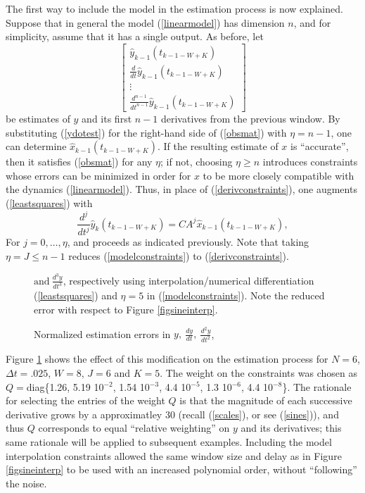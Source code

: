 The first way to include the model in the estimation process is now
explained.  Suppose that in general the model (\ref{linearmodel}) has dimension
$n$, and for simplicity, assume that it has a single output.
As before, let
\begin{equation}
\left[ \begin{array}{c} 
\hat{y}_{k-1}(t_{k-1-W+K}) \\
\frac{d}{dt} \hat{y}_{k-1}(t_{k-1-W+K}) \\ 
\vdots \\ 
\frac{d^{n-1}}{dt^{n-1}} \hat{y}_{k-1}(t_{k-1-W+K})
\end{array} \right]
\label{ydotest}
\end{equation}
be estimates of $y$ and its first $n-1$ derivatives from the previous window.
By substituting (\ref{ydotest}) for the right-hand side of (\ref{obsmat}) with
$\eta = n-1$, one can
determine $\hat{x}_{k-1}(t_{k-1-W+K})$. 
If the resulting estimate of $x$ is ``accurate'', then it satisfies (\ref{obsmat}) for
any $\eta$; if not, choosing $\eta \ge n$ introduces constraints whose
errors can be minimized in order for $x$ to be more closely compatible
with the dynamics (\ref{linearmodel}).  Thus, in place of
(\ref{derivconstraints}),
one augments (\ref{leastsquares}) with
\begin{equation}
\frac{d^j}{dt^j} \hat{y}_k(t_{k-1-W+K}) = CA^j  \hat{x}_{k-1}(t_{k-1-W+K}),
\label{modelconstraints}
\end{equation}
For $j=0, \ldots, \eta$, and proceeds as indicated previously.  
Note that taking $\eta =J \le n-1$ reduces 
(\ref{modelconstraints}) to (\ref{derivconstraints}).



\begin{figure}[hbt]
\centerline{}
\smallskip
\caption{\small Normalized estimation errors in $y, \ \frac{dy}{dt}, \
\frac{d^2y}{dt^2}$,}
$ \mbox{and} \
\frac{d^3y}{dt^3}$, respectively using interpolation/numerical differentiation
(\protect\ref{leastsquares}) and $\eta=5$ in (\protect\ref{modelconstraints}).  Note the reduced error with respect to
Figure \protect\ref{figsineinterp}. 
\label{figsinesplineorder5}
\end{figure}


Figure \ref{figsinesplineorder5} shows the
effect of this modification on the estimation process for $N=6$, $\Delta t = .025$, 
$W=8$, $J=6$ and $K=5$.  The weight on the constraints was chosen as 
$ Q =$diag\{1.26, 5.19 10$^{-2}$, 1.54 10$^{-3}$, 4.4 10$^{-5}$, 1.3 10$^{-6}$,
4.4 10$^{-8}$\}.
The rationale for
selecting the entries of the
weight $Q$ is that the magnitude of each successive derivative grows by a
approximatley
30 (recall (\ref{scales}), or see (\ref{sines})), 
and thus $Q$ corresponds to equal ``relative
weighting'' on $y$ and its derivatives;
this same rationale will be applied to subsequent examples. Including the model
interpolation constraints allowed the same window size and delay as in Figure
\ref{figsineinterp} to be used with an increased polynomial order, without
``following'' the noise.


